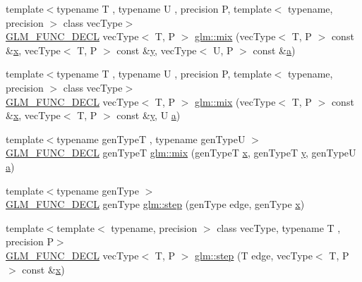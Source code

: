 \begin{DoxyCompactItemize}
\item 
{\footnotesize template$<$typename T , typename U , precision P, template$<$ typename, precision $>$ class vec\+Type$>$ }\\\mbox{\hyperlink{setup_8hpp_ab2d052de21a70539923e9bcbf6e83a51}{G\+L\+M\+\_\+\+F\+U\+N\+C\+\_\+\+D\+E\+CL}} vec\+Type$<$ T, P $>$ \mbox{\hyperlink{group__core__func__common_gadccbaffe46f369cf1a96b2aef92cbfdd}{glm\+::mix}} (vec\+Type$<$ T, P $>$ const \&\mbox{\hyperlink{glad_8h_a92d0386e5c19fb81ea88c9f99644ab1d}{x}}, vec\+Type$<$ T, P $>$ const \&\mbox{\hyperlink{glad_8h_a66ddd433d2cacfe27f5906b7e86faeed}{y}}, vec\+Type$<$ U, P $>$ const \&\mbox{\hyperlink{glad_8h_ac8729153468b5dcf13f971b21d84d4e5}{a}})
\item 
{\footnotesize template$<$typename T , typename U , precision P, template$<$ typename, precision $>$ class vec\+Type$>$ }\\\mbox{\hyperlink{setup_8hpp_ab2d052de21a70539923e9bcbf6e83a51}{G\+L\+M\+\_\+\+F\+U\+N\+C\+\_\+\+D\+E\+CL}} vec\+Type$<$ T, P $>$ \mbox{\hyperlink{group__core__func__common_gaa51ef964cbf80ee9c2364d629693c8c8}{glm\+::mix}} (vec\+Type$<$ T, P $>$ const \&\mbox{\hyperlink{glad_8h_a92d0386e5c19fb81ea88c9f99644ab1d}{x}}, vec\+Type$<$ T, P $>$ const \&\mbox{\hyperlink{glad_8h_a66ddd433d2cacfe27f5906b7e86faeed}{y}}, U \mbox{\hyperlink{glad_8h_ac8729153468b5dcf13f971b21d84d4e5}{a}})
\item 
{\footnotesize template$<$typename gen\+TypeT , typename gen\+TypeU $>$ }\\\mbox{\hyperlink{setup_8hpp_ab2d052de21a70539923e9bcbf6e83a51}{G\+L\+M\+\_\+\+F\+U\+N\+C\+\_\+\+D\+E\+CL}} gen\+TypeT \mbox{\hyperlink{group__core__func__common_ga8e93f374aae27d1a88b921860351f8d4}{glm\+::mix}} (gen\+TypeT \mbox{\hyperlink{glad_8h_a92d0386e5c19fb81ea88c9f99644ab1d}{x}}, gen\+TypeT \mbox{\hyperlink{glad_8h_a66ddd433d2cacfe27f5906b7e86faeed}{y}}, gen\+TypeU \mbox{\hyperlink{glad_8h_ac8729153468b5dcf13f971b21d84d4e5}{a}})
\item 
{\footnotesize template$<$typename gen\+Type $>$ }\\\mbox{\hyperlink{setup_8hpp_ab2d052de21a70539923e9bcbf6e83a51}{G\+L\+M\+\_\+\+F\+U\+N\+C\+\_\+\+D\+E\+CL}} gen\+Type \mbox{\hyperlink{group__core__func__common_ga015a1261ff23e12650211aa872863cce}{glm\+::step}} (gen\+Type edge, gen\+Type \mbox{\hyperlink{glad_8h_a92d0386e5c19fb81ea88c9f99644ab1d}{x}})
\item 
{\footnotesize template$<$template$<$ typename, precision $>$ class vec\+Type, typename T , precision P$>$ }\\\mbox{\hyperlink{setup_8hpp_ab2d052de21a70539923e9bcbf6e83a51}{G\+L\+M\+\_\+\+F\+U\+N\+C\+\_\+\+D\+E\+CL}} vec\+Type$<$ T, P $>$ \mbox{\hyperlink{group__core__func__common_gaf15b74ab672af2c7d7b535a9b4803700}{glm\+::step}} (T edge, vec\+Type$<$ T, P $>$ const \&\mbox{\hyperlink{glad_8h_a92d0386e5c19fb81ea88c9f99644ab1d}{x}})

\end{DoxyCompactItemize}
